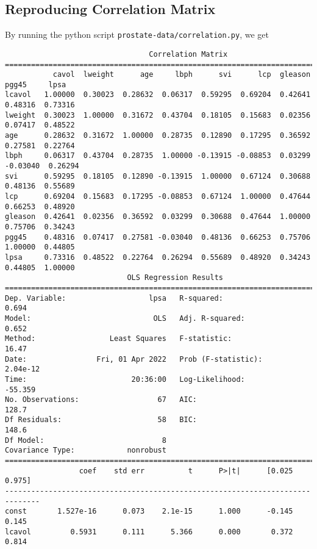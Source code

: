 \documentclass[11pt]{article}
\theoremstyle{definition}
\begin{document}
\subsection{Reproducing Correlation Matrix}
By running the python script \texttt{prostate-data/correlation.py}, we get
	{\footnotesize
		\begin{verbatim}
                                 Correlation Matrix
========================================================================================
           cavol  lweight      age     lbph      svi      lcp  gleason    pgg45     lpsa
lcavol   1.00000  0.30023  0.28632  0.06317  0.59295  0.69204  0.42641  0.48316  0.73316
lweight  0.30023  1.00000  0.31672  0.43704  0.18105  0.15683  0.02356  0.07417  0.48522
age      0.28632  0.31672  1.00000  0.28735  0.12890  0.17295  0.36592  0.27581  0.22764
lbph     0.06317  0.43704  0.28735  1.00000 -0.13915 -0.08853  0.03299 -0.03040  0.26294
svi      0.59295  0.18105  0.12890 -0.13915  1.00000  0.67124  0.30688  0.48136  0.55689
lcp      0.69204  0.15683  0.17295 -0.08853  0.67124  1.00000  0.47644  0.66253  0.48920
gleason  0.42641  0.02356  0.36592  0.03299  0.30688  0.47644  1.00000  0.75706  0.34243
pgg45    0.48316  0.07417  0.27581 -0.03040  0.48136  0.66253  0.75706  1.00000  0.44805
lpsa     0.73316  0.48522  0.22764  0.26294  0.55689  0.48920  0.34243  0.44805  1.00000
                            OLS Regression Results                            
==============================================================================
Dep. Variable:                   lpsa   R-squared:                       0.694
Model:                            OLS   Adj. R-squared:                  0.652
Method:                 Least Squares   F-statistic:                     16.47
Date:                Fri, 01 Apr 2022   Prob (F-statistic):           2.04e-12
Time:                        20:36:00   Log-Likelihood:                -55.359
No. Observations:                  67   AIC:                             128.7
Df Residuals:                      58   BIC:                             148.6
Df Model:                           8                                         
Covariance Type:            nonrobust                                         
==============================================================================
                 coef    std err          t      P>|t|      [0.025      0.975]
------------------------------------------------------------------------------
const       1.527e-16      0.073    2.1e-15      1.000      -0.145       0.145
lcavol         0.5931      0.111      5.366      0.000       0.372       0.814

\end{verbatim}}
\end{document}
